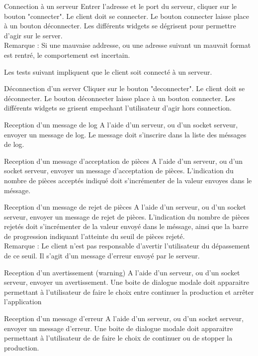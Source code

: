     {Connection à un serveur}
    {Entrer l'adresse et le port du serveur, cliquer sur le bouton "connecter".}
    {Le client doit se connecter.
    Le bouton connecter laisse place à un bouton déconnecter.
    Les différents widgets se dégrisent pour permettre d'agir sur le server.\\
    Remarque : Si une mauvaise addresse, ou une adresse suivant un mauvait format est rentré, le comportement est incertain.}

Les tests suivant impliquent que le client soit connecté à un serveur.

    {Déconnection d'un server}
    {Cliquer sur le bouton "deconnecter".}
    {Le client doit se déconnecter.
    Le bouton déconnecter laisse place à un bouton connecter.
    Les différents widgets se grisent empechant l'utilisateur d'agir hors connection.}

{Reception d'un message de log}
    {A l'aide d'un serveur, ou d'un socket serveur, envoyer un message de log.}
    {Le message doit s'inscrire dans la liste des méssages de log.}

{Reception d'un message d'acceptation de pièces}
    {A l'aide d'un serveur, ou d'un socket serveur, envoyer un message d'acceptation de pièces.}
    {L'indication du nombre de pièces acceptés indiqué doit s'incrémenter de la valeur envoyes dans le méssage.}

{Reception d'un message de rejet de pièces}
    {A l'aide d'un serveur, ou d'un socket serveur, envoyer un message de rejet de pièces.}
    {L'indication du nombre de pièces rejetés doit s'incrémenter de la valeur envoyé dans le méssage, ainsi que la barre de progression indiquant l'atteinte du seuil de pièces rejeté.\\
    Remarque : Le client n'est pas responsable d'avertir l'utilisateur du dépassement de ce seuil. Il s'agit d'un message d'erreur envoyé par le serveur.}

{Reception d'un avertissement (warning)}
    {A l'aide d'un serveur, ou d'un socket serveur, envoyer un avertissement.}
    {Une boite de dialogue modale doit apparaitre permettant à l'utilisateur de faire le choix entre continuer la production et arrêter l'application}

{Reception d'un message d'erreur}
	{A l'aide d'un serveur, ou d'un socket serveur, envoyer un message d'erreur.}
	{Une boite de dialogue modale doit apparaitre permettant à l'utilisateur de de faire le choix de continuer ou de stopper la production.}

